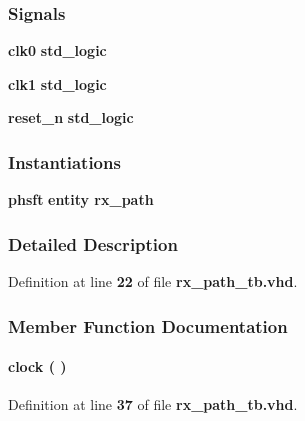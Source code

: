 \subsubsection*{Signals}
 \begin{DoxyCompactItemize}
\item 
{\bf clk0} {\bfseries \textcolor{comment}{std\+\_\+logic}\textcolor{vhdlchar}{ }} 
\item 
{\bf clk1} {\bfseries \textcolor{comment}{std\+\_\+logic}\textcolor{vhdlchar}{ }} 
\item 
{\bf reset\+\_\+n} {\bfseries \textcolor{comment}{std\+\_\+logic}\textcolor{vhdlchar}{ }} 
\end{DoxyCompactItemize}
\subsubsection*{Instantiations}
 \begin{DoxyCompactItemize}
\item 
{\bf phsft}  {\bfseries entity rx\+\_\+path}   
\end{DoxyCompactItemize}


\subsubsection{Detailed Description}


Definition at line {\bf 22} of file {\bf rx\+\_\+path\+\_\+tb.\+vhd}.



\subsubsection{Member Function Documentation}
\paragraph[{clock}]{\setlength{\rightskip}{0pt plus 5cm} {\bfseries \textcolor{vhdlchar}{ }} clock ( ) \hspace{0.3cm}{\ttfamily [Process]}}\label{classrx__path__tb_1_1tb__behave_af761a67e9d7ce9e23381088b6f2ae893}


Definition at line {\bf 37} of file {\bf rx\+\_\+path\+\_\+tb.\+vhd}.

